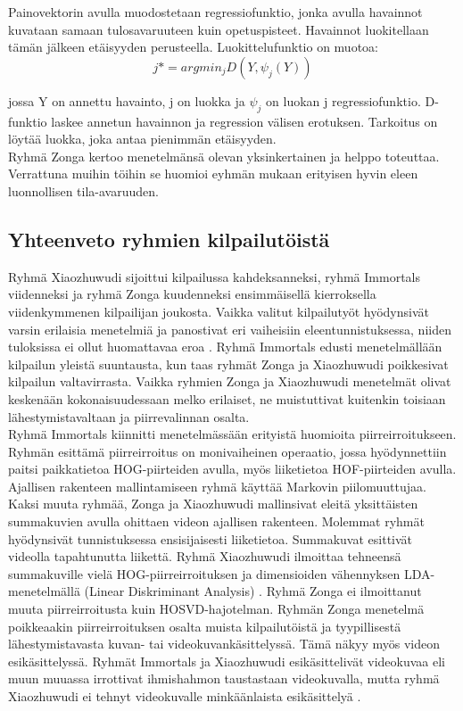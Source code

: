 Painovektorin avulla muodostetaan regressiofunktio, jonka avulla havainnot kuvataan samaan tulosavaruuteen kuin opetuspisteet. Havainnot
luokitellaan tämän jälkeen etäisyyden perusteella. Luokittelufunktio on muotoa:
\begin{equation}
j*=argmin_{j}D(Y,\psi_{j}(Y))
\end{equation}

jossa Y on annettu havainto, j on luokka ja $\psi_{j}$ on luokan j regressiofunktio. D-funktio laskee annetun havainnon ja regression välisen erotuksen.
Tarkoitus on löytää luokka, joka antaa pienimmän etäisyyden.\\ 

Ryhmä Zonga kertoo menetelmänsä olevan yksinkertainen ja helppo toteuttaa. 
Verrattuna muihin töihin se huomioi eyhmän mukaan erityisen hyvin eleen luonnollisen tila-avaruuden. \citep{firstround} 

\subsection{Yhteenveto ryhmien kilpailutöistä}

Ryhmä Xiaozhuwudi sijoittui kilpailussa kahdeksanneksi, ryhmä Immortals viidenneksi ja ryhmä Zonga kuudenneksi ensimmäisellä kierroksella
viidenkymmenen kilpailijan joukosta. Vaikka valitut kilpailutyöt hyödynsivät varsin erilaisia menetelmiä ja panostivat eri vaiheisiin eleentunnistuksessa,
niiden tuloksissa ei ollut huomattavaa eroa \citep{6239178}. Ryhmä Immortals edusti menetelmällään kilpailun yleistä suuntausta,
kun taas ryhmät Zonga ja Xiaozhuwudi poikkesivat kilpailun valtavirrasta. Vaikka ryhmien Zonga ja Xiaozhuwudi menetelmät olivat keskenään
kokonaisuudessaan melko erilaiset, ne muistuttivat kuitenkin toisiaan lähestymistavaltaan ja piirrevalinnan osalta.\\

Ryhmä Immortals kiinnitti menetelmässään erityistä huomioita piirreirroitukseen. Ryhmän esittämä piirreirroitus on monivaiheinen operaatio,
jossa hyödynnettiin paitsi paikkatietoa HOG-piirteiden avulla, myös liiketietoa HOF-piirteiden avulla.
Ajallisen rakenteen mallintamiseen ryhmä käyttää Markovin piilomuuttujaa. Kaksi muuta ryhmää,
Zonga ja Xiaozhuwudi mallinsivat eleitä yksittäisten summakuvien avulla ohittaen videon ajallisen rakenteen.
Molemmat ryhmät hyödynsivät tunnistuksessa ensisijaisesti liiketietoa. Summakuvat esittivät videolla tapahtunutta liikettä.
Ryhmä Xiaozhuwudi ilmoittaa tehneensä summakuville vielä HOG-piirreirroituksen ja dimensioiden vähennyksen LDA-menetelmällä (Linear Diskriminant Analysis) \citep{6239179}.
Ryhmä Zonga ei ilmoittanut muuta piirreirroitusta kuin HOSVD-hajotelman. Ryhmän Zonga menetelmä poikkeaakin piirreirroituksen osalta
muista kilpailutöistä ja tyypillisestä lähestymistavasta kuvan- tai videokuvankäsittelyssä. Tämä näkyy myös videon esikäsittelyssä. 
Ryhmät Immortals ja Xiaozhuwudi esikäsittelivät videokuvaa eli muun muuassa irrottivat ihmishahmon taustastaan videokuvalla,
mutta ryhmä Xiaozhuwudi ei tehnyt videokuvalle minkäänlaista esikäsittelyä \citep{firstround}.\\

